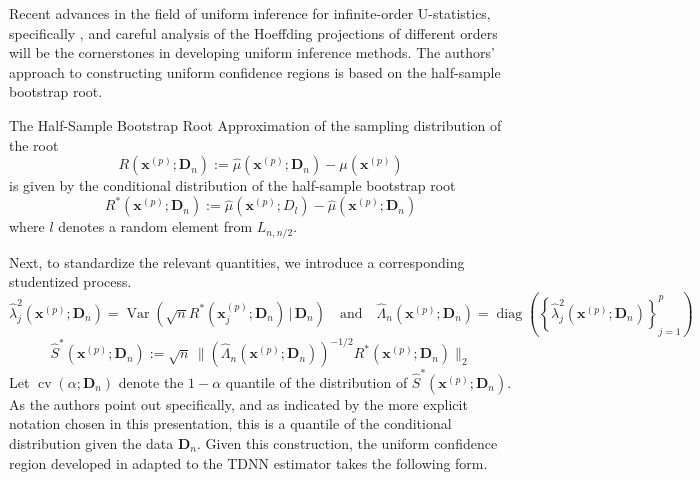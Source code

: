 \documentclass[letterpaper,10pt]{article}
\numberwithin{equation}{section}
\numberwithin{theorem}{section}
\theoremstyle{definition}
\renewcommand{\hat}{\widehat}
\newcommand{\1}{\mathbb{1}}
\begin{document}
Recent advances in the field of uniform inference for infinite-order U-statistics, specifically \citet{ritzwoller_uniform_2024}, and careful analysis of the Hoeffding projections of different orders will be the cornerstones in developing uniform inference methods.
The authors' approach to constructing uniform confidence regions is based on the half-sample bootstrap root.

\vspace{0.5cm}
\begin{definition}
	The Half-Sample Bootstrap Root Approximation of the sampling distribution of the root
	\begin{equation}
		R\left(\mathbf{x}^{(p)}; \mathbf{D}_n\right)
		:= \hat{\mu}\left(\mathbf{x}^{(p)}; \mathbf{D}_n\right) - \mu(\mathbf{x}^{(p)})
	\end{equation}
	is given by the conditional distribution of the half-sample bootstrap root
	\begin{equation}
		R^{*}\left(\mathbf{x}^{(p)}; \mathbf{D}_n\right)
		:= \hat{\mu}\left(\mathbf{x}^{(p)}; D_l\right) - \hat{\mu}\left(\mathbf{x}^{(p)}; \mathbf{D}_n\right)
	\end{equation}
	where $l$ denotes a random element from $L_{n, n/2}$.
\end{definition}
Next, to standardize the relevant quantities, we introduce a corresponding studentized process.
\begin{equation}
	\hat{\lambda}_{j}^{2}\left(\mathbf{x}^{(p)}; \mathbf{D}_n\right) = \operatorname{Var}\left(\sqrt{n} R^{*}(\mathbf{x}^{(p)}_{j}; \mathbf{D}_n) \, | \, \mathbf{D}_n\right)
	\quad \text{and} \quad
	\hat{\Lambda}_n\left(\mathbf{x}^{(p)}; \mathbf{D}_n\right) = \operatorname{diag}\left(\left\{\hat{\lambda}_{j}^{2}\left(\mathbf{x}^{(p)}; \mathbf{D}_n\right)\right\}_{j = 1}^{p}\right)
\end{equation}
\begin{equation}
	\hat{S}^{*}\left(\mathbf{x}^{(p)}; \mathbf{D}_n\right)
	:= \sqrt{n} \, \Big\| \left(\hat{\Lambda}_n\left(\mathbf{x}^{(p)}; \mathbf{D}_n\right)\right)^{-1/2} R^{*}\left(\mathbf{x}^{(p)}; \mathbf{D}_n\right)\Big\|_{2}
\end{equation}
Let $\operatorname{cv}\left(\alpha; \mathbf{D}_n\right)$ denote the $1-\alpha$ quantile of the distribution of $\hat{S}^{*}\left(\mathbf{x}^{(p)}; \mathbf{D}_n\right)$.
As the authors point out specifically, and as indicated by the more explicit notation chosen in this presentation, this is a quantile of the conditional distribution given the data $\mathbf{D}_n$.
Given this construction, the uniform confidence region developed in \citet{ritzwoller_uniform_2024} adapted to the TDNN estimator takes the following form.
\end{document}
